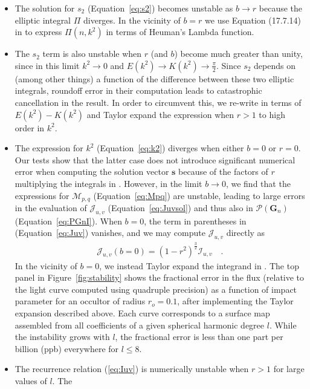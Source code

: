 \documentclass[modern]{aastex61}
\begin{document}
\begin{itemize}
%
\item The solution for $s_2$ (Equation~\ref{eq:s2}) becomes unstable as $b \rightarrow r$ because
the elliptic integral $\Pi$ diverges. In the vicinity of
$b = r$ we use Equation (17.7.14) in \citet{Abramowitz1970} to express $\Pi(n, k^2)$
in terms of Heuman's Lambda function. 
%
\item The $s_2$ term is also unstable when $r$ (and $b$) become much greater than unity, since
in this limit $k^2 \rightarrow 0$ and $E(k^2) \rightarrow K(k^2) \rightarrow \frac{\pi}{2}.$
Since $s_2$ depends on (among other things) a function of the difference between these two
elliptic integrals, roundoff error in their computation leads to catastrophic cancellation
in the result. In order to circumvent this, we re-write  in terms of $E(k^2) - K(k^2)$
and Taylor expand the expression when $r > 1$ to high order in $k^2$.
%
\item The expression for $k^2$ (Equation~\ref{eq:k2}) diverges when either $b = 0$
or $r = 0$. Our tests show that the latter case does not introduce significant numerical
error when computing the solution vector $\mathbf{s}$ because of the factors of $r$
multiplying the integrals in . However, in the limit $b \rightarrow 0$,
we find that the expressions for $\mathcal{M}_{p,q}$ (Equation~\ref{eq:Mpq}) are unstable,
leading to large errors in the evaluation of $\mathcal{J}_{u,v}$ (Equation~\ref{eq:Juvsol})
and thus also in $\mathcal{P}(\mathbf{G}_n)$ (Equation~\ref{eq:PGnI}). When $b = 0$, the term in
parentheses in (Equation~\ref{eq:Juv}) vanishes, and we may compute $\mathcal{J}_{u,v}$
directly as
%
\begin{align}
    \mathcal{J}_{u,v}(b = 0) = (1 - r^2)^\frac{3}{2} \mathcal{I}_{u,v} \quad.
\end{align}
%
In the vicinity of $b = 0$, we instead Taylor expand the integrand in .
The top panel in Figure~\ref{fig:stability} shows the fractional error in the flux
(relative to the light curve computed using quadruple precision)
as a function of impact parameter for an occultor of radius $r_o = 0.1$, after
implementing the Taylor expansion described above. Each curve
corresponds to a surface map assembled from all coefficients of a given
spherical harmonic degree $l$. While the instability grows with $l$, the fractional
error is less than one part per billion (ppb) everywhere for $l \leq 8$.
%
\item The recurrence relation (\ref{eq:Iuv}) is numerically unstable when $r > 1$ for large values of $l$. The

\end{itemize}
\end{document}
